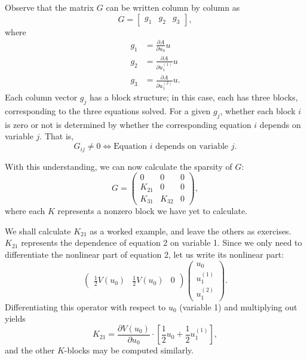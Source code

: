 \documentclass[10pt,authoryear]{elsarticle}
\begin{document}
Observe that the matrix $G$ can be written column by column as
\begin{equation}
G = \begin{bmatrix} g_1 & g_2 & g_3 \end{bmatrix},
\end{equation}
where
\begin{align}
g_1 &= \frac{\partial A}{\partial u_0} u \\
g_2 &= \frac{\partial A}{\partial u_1^{(1)}} u \\
g_3 &= \frac{\partial A}{\partial u_1^{(2)}} u.
\end{align}
Each column vector $g_j$ has a block structure; in this case, each has three blocks, corresponding to
the three equations solved. For a given $g_j$, whether each block $i$ is zero or not is determined by whether
the corresponding equation $i$ depends on variable $j$. That is,
\begin{equation}
G_{ij} \ne 0 \iff \text{Equation $i$ depends on variable $j$}.
\end{equation}

With this understanding, we can now calculate the sparsity of $G$:
\begin{equation}
G = \begin{pmatrix}
0 & 0 & 0 \\
K_{21} & 0 & 0 \\
K_{31} & K_{32} & 0 \end{pmatrix},
\end{equation}
where each $K$ represents a nonzero block we have yet to calculate.

We shall calculate $K_{21}$ as a worked example, and leave the others as exercises.
$K_{21}$ represents the dependence of equation 2 on variable 1. Since we only need to differentiate
the nonlinear part of equation 2, let us write its nonlinear part:
\begin{equation}
\begin{pmatrix} \frac{1}{2}V(u_0) & \frac{1}{2}V(u_0) & 0 \end{pmatrix} 
\begin{pmatrix} u_0 \\ u_1^{(1)} \\ u_1^{(2)} \end{pmatrix}.
\end{equation}
Differentiating this operator with respect to $u_0$ (variable 1) and multiplying out yields
\begin{equation}
K_{21} = \frac{\partial V(u_0)}{\partial u_0} \cdot \left[\frac{1}{2}u_0 + \frac{1}{2}u_1^{(1)}\right],
\end{equation}
and the other $K$-blocks may be computed similarly.
\end{document}
